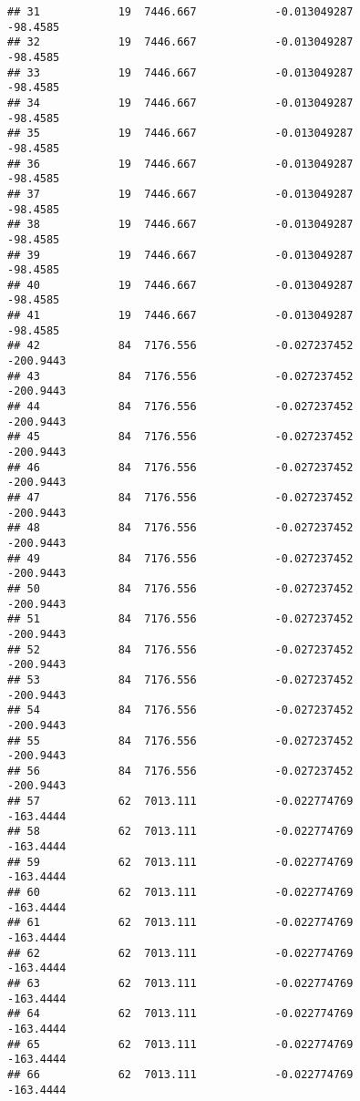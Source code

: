 \documentclass[]{article}
\begin{document}
\begin{verbatim}
## 31            19  7446.667            -0.013049287           -98.4585
## 32            19  7446.667            -0.013049287           -98.4585
## 33            19  7446.667            -0.013049287           -98.4585
## 34            19  7446.667            -0.013049287           -98.4585
## 35            19  7446.667            -0.013049287           -98.4585
## 36            19  7446.667            -0.013049287           -98.4585
## 37            19  7446.667            -0.013049287           -98.4585
## 38            19  7446.667            -0.013049287           -98.4585
## 39            19  7446.667            -0.013049287           -98.4585
## 40            19  7446.667            -0.013049287           -98.4585
## 41            19  7446.667            -0.013049287           -98.4585
## 42            84  7176.556            -0.027237452          -200.9443
## 43            84  7176.556            -0.027237452          -200.9443
## 44            84  7176.556            -0.027237452          -200.9443
## 45            84  7176.556            -0.027237452          -200.9443
## 46            84  7176.556            -0.027237452          -200.9443
## 47            84  7176.556            -0.027237452          -200.9443
## 48            84  7176.556            -0.027237452          -200.9443
## 49            84  7176.556            -0.027237452          -200.9443
## 50            84  7176.556            -0.027237452          -200.9443
## 51            84  7176.556            -0.027237452          -200.9443
## 52            84  7176.556            -0.027237452          -200.9443
## 53            84  7176.556            -0.027237452          -200.9443
## 54            84  7176.556            -0.027237452          -200.9443
## 55            84  7176.556            -0.027237452          -200.9443
## 56            84  7176.556            -0.027237452          -200.9443
## 57            62  7013.111            -0.022774769          -163.4444
## 58            62  7013.111            -0.022774769          -163.4444
## 59            62  7013.111            -0.022774769          -163.4444
## 60            62  7013.111            -0.022774769          -163.4444
## 61            62  7013.111            -0.022774769          -163.4444
## 62            62  7013.111            -0.022774769          -163.4444
## 63            62  7013.111            -0.022774769          -163.4444
## 64            62  7013.111            -0.022774769          -163.4444
## 65            62  7013.111            -0.022774769          -163.4444
## 66            62  7013.111            -0.022774769          -163.4444

\end{verbatim}
\end{document}

